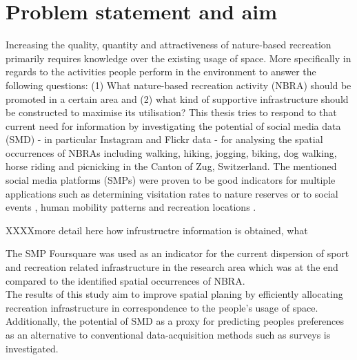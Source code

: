 \section{Problem statement and aim}
Increasing the quality, quantity and attractiveness of nature-based recreation primarily requires knowledge over the existing usage of space. More specifically in regards to the activities people perform in the environment to answer the following questions: (1) What nature-based recreation activity (NBRA) should be promoted in a certain area and (2) what kind of supportive infrastructure should be constructed to maximise its utilisation? This thesis tries to respond to that current need for information by investigating the potential of social media data (SMD) - in particular Instagram and Flickr data - for analysing the spatial occurrences of NBRAs including walking, hiking, jogging, biking, dog walking, horse riding and picnicking in the Canton of Zug, Switzerland. The mentioned social media platforms (SMPs) were proven to be good indicators for multiple applications such as determining visitation rates to nature reserves \parencite{Tenkanen2017, Heikinheimo2017, Keeler2015, Wood2013} or to social events \parencite{Pettersson2011}, human mobility patterns \parencite{Barchiesi2015, Grossenbacher2014} and recreation locations \parencite{Weyland2014, Hill2006, Neuvonen2010}. 

XXXXmore detail here how infrustructre information is obtained, what 

The SMP Foursquare was used as an indicator for the current dispersion of sport and recreation related infrastructure in the research area which was at the end compared to the identified spatial occurrences of NBRA.\\
The results of this study aim to improve spatial planing by efficiently allocating recreation infrastructure in correspondence to the people's usage of space. Additionally, the potential of SMD as a proxy for predicting peoples preferences as an alternative to conventional data-acquisition methods such as surveys is investigated.\\

